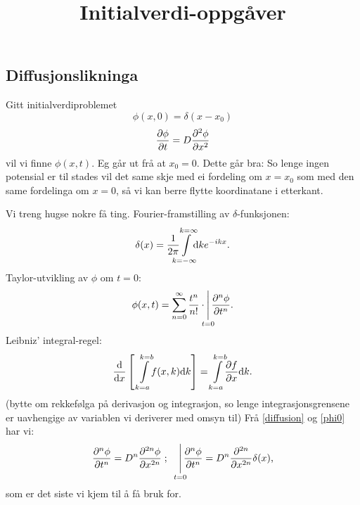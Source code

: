 \documentclass[12pt]{article}
\title{Initialverdi-oppgåver}
\begin{document}
\maketitle
\begin{multicols*}{2}\noindent %
    \section{Diffusjonslikninga}
    Gitt initialverdiproblemet
    \begin{equation}
        \phi(x, 0) = \delta(x - x_0)
        \label{phi0}
    \end{equation}
    \begin{equation}
        \frac{\partial \phi}{\partial t} = D\frac{\partial^{2} \phi}{\partial x ^{2}}
        \label{diffusion}
    \end{equation}
    vil vi finne $\phi(x, t)$.
    Eg går ut frå at $x_0 = 0$.
    Dette går bra: So lenge ingen potensial er til stades
    vil det same skje med ei fordeling om $x = x_0$ som med den
    same fordelinga om $x = 0$, så vi kan berre flytte
    koordinatane i etterkant.

    Vi treng hugse nokre få ting.
    Fourier-framstilling av $\delta$-funksjonen:
    \begin{equation}
        \delta(x) = \frac{1}{2\pi}
        \smashoperator{\int\limits_{k = -\infty}^{k = \infty}}
        \D k e^{-ikx} \text.
        \label{deltafn}
    \end{equation}
    Taylor-utvikling av $\phi$ om $t = 0$:
    \begin{equation}
        \phi(x, t) = \sum_{n = 0}^\infty
        \frac{t^n}{n!} \cdot \smashoperator{\Sub\limits_{t = 0}} \deldelN{\phi}{t}{n}
        \text.
        \label{tay}
    \end{equation}
    Leibniz' integral-regel:
    \begin{equation}
        \dd{}{x} \left[\;
            \smashoperator[r]{\int\limits_{k=a}^{k=b}} f(x, k) \D k
        \right]
        =
        \smashoperator[r]{\int\limits_{k=a}^{k=b}} \deldel{f}{x} \D k
        \text.
        \label{papa}
    \end{equation}
    (bytte om rekkefølga på derivasjon og integrasjon,
     so lenge integrasjonsgrensene er uavhengige av
     variablen vi deriverer med omsyn til)
     Frå \eqref{diffusion} og \eqref{phi0} har vi:
    \begin{equation}
        \deldelN{\phi}{t}{n} = D^n \deldelN{\phi}{x}{2n}
        \;\text;\quad
        \smashoperator{\Sub\limits_{t=0}} \deldelN{\phi}{t}{n}
        = D^n \deldelN{}{x}{2n} \delta(x)
        \text,
        \label{diffusionN}
    \end{equation}
    som er det siste vi kjem til å få bruk for.


\end{multicols*}
\end{document}

